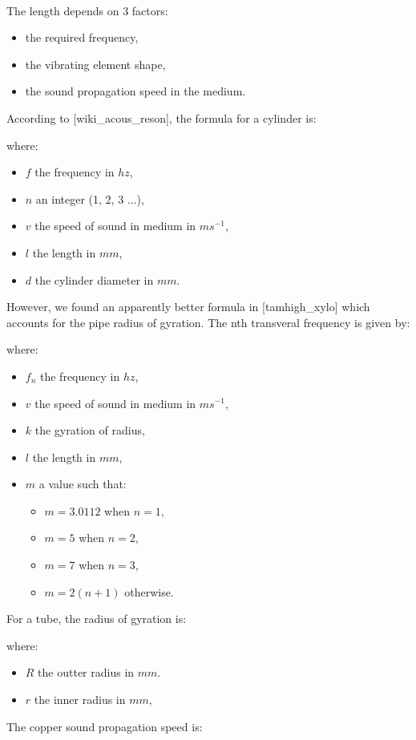 \documentclass[12pt]{article}
\begin{document}
\paragraph{} The length depends on 3 factors:
\begin{itemize}
  \item the required frequency,
  \item the vibrating element shape,
  \item the sound propagation speed in the medium.
\end{itemize}
According to [wiki\_acous\_reson], the formula for a cylinder is:
\begin{center}
\end{center}
where:
\begin{itemize}
  \item $f$ the frequency in $hz$,
  \item $n$ an integer (1, 2, 3 ...),
  \item $v$ the speed of sound in medium in $ms^{-1}$,
  \item $l$ the length in $mm$,
  \item $d$ the cylinder diameter in $mm$.
\end{itemize}
However, we found an apparently better formula in [tamhigh\_xylo]
which accounts for the pipe radius of gyration. The nth transveral
frequency is given by:
\begin{center}
\end{center}
where:
\begin{itemize}
  \item $f_{n}$ the frequency in $hz$,
  \item $v$ the speed of sound in medium in $ms^{-1}$,
  \item $k$ the gyration of radius,
  \item $l$ the length in $mm$,
  \item $m$ a value such that:
    \begin{itemize}
      \item $m = 3.0112$ when $n = 1$,
      \item $m = 5$ when $n = 2$,
      \item $m = 7$ when $n = 3$,
      \item $m = 2(n + 1)$ otherwise.
    \end{itemize}
\end{itemize}
For a tube, the radius of gyration is:
\begin{center}
\end{center}
where:
\begin{itemize}
  \item $R$ the outter radius in $mm$.
  \item $r$ the inner radius in $mm$,
\end{itemize}
The copper sound propagation speed is:
\begin{center}
\end{center}
\end{document}
